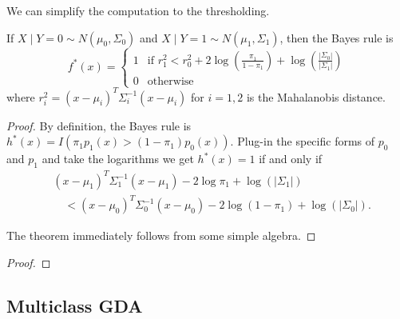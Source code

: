   \begin{theorem}
    
  \end{theorem}

  We can simplify the computation to the thresholding.  

  \begin{theorem}
    If $X \mid Y = 0 \sim N(\mu_0, \Sigma_0)$ and $X \mid Y = 1 \sim N(\mu_1, \Sigma_1)$, then the Bayes rule is
    \begin{equation}
      f^{\ast}(x) = \begin{cases}
        1 & \text{if } r_1^2 < r_0^2 + 2\log\left(\frac{\pi_1}{1-\pi_1}\right) + \log\left(\frac{|\Sigma_0|}{|\Sigma_1|}\right) \\
        0 & \text{otherwise}
      \end{cases}
    \end{equation}
    where $r_i^2 = (x - \mu_i)^T \Sigma_i^{-1} (x - \mu_i)$ for $i = 1, 2$ is the Mahalanobis distance.
  \end{theorem}
  \begin{proof}
    By definition, the Bayes rule is $h^{\ast}(x) = I(\pi_1 p_1(x) > (1 - \pi_1)p_0(x))$. Plug-in the specific forms of $p_0$ and $p_1$ and take the logarithms we get $h^{\ast}(x) = 1$ if and only if
    \begin{align}
      &(x - \mu_1)^T \Sigma_1^{-1} (x - \mu_1) - 2\log\pi_1 + \log(|\Sigma_1|) \\
      &\quad < (x - \mu_0)^T \Sigma_0^{-1} (x - \mu_0) - 2\log(1 - \pi_1) + \log(|\Sigma_0|).
    \end{align}
    
    The theorem immediately follows from some simple algebra.
  \end{proof} 

  \begin{theorem}
    
  \end{theorem}
  \begin{proof}
    
  \end{proof}

\subsection{Multiclass GDA} 

